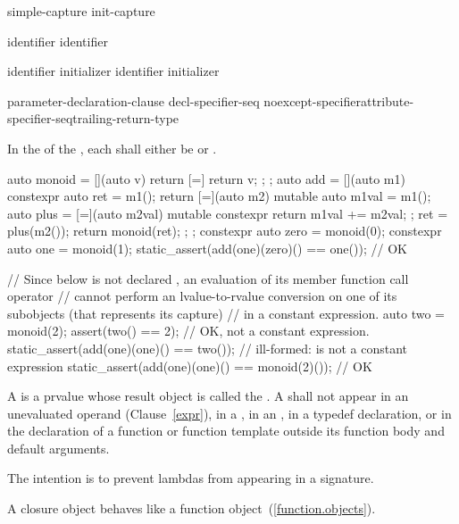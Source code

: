 \begin{bnf}
\br
    simple-capture\br
    init-capture
\end{bnf}

\begin{bnf}
\br
    identifier\br
    \terminal{\&} identifier\br
    \br
\end{bnf}

\begin{bnf}
\br
    identifier initializer\br
    \terminal{\&} identifier initializer
\end{bnf}

\begin{bnf}
\br
    \terminal{(} parameter-declaration-clause \terminal{)} decl-specifier-seq\opt\br
    \hspace*{\bnfindentinc}noexcept-specifier\opt attribute-specifier-seq\opt trailing-return-type\opt
\end{bnf}

\pnum
In the  of the ,
each 
shall either be  or .
\begin{example}
\begin{codeblock}
auto monoid = [](auto v) { return [=] { return v; }; };
auto add = [](auto m1) constexpr {
  auto ret = m1();
  return [=](auto m2) mutable {
    auto m1val = m1();
    auto plus = [=](auto m2val) mutable constexpr
                   { return m1val += m2val; };
    ret = plus(m2());
    return monoid(ret);
  };
};
constexpr auto zero = monoid(0);
constexpr auto one = monoid(1);
static_assert(add(one)(zero)() == one()); // OK

// Since  below is not declared , an evaluation of its  member function call operator
// cannot perform an lvalue-to-rvalue conversion on one of its subobjects (that represents its capture)
// in a constant expression.
auto two = monoid(2);
assert(two() == 2); // OK, not a constant expression.
static_assert(add(one)(one)() == two()); // ill-formed:  is not a constant expression
static_assert(add(one)(one)() == monoid(2)()); // OK
\end{codeblock}
\end{example}

\pnum
A  is a prvalue
whose result object is called the . A
 shall not appear in an unevaluated operand
(Clause~\ref{expr}), in a ,
in an ,
in a typedef declaration, or in the declaration of a function or function
template outside its function body and default arguments.
\begin{note}
The intention is to prevent lambdas from appearing in a signature.
\end{note}
\begin{note}
A closure object behaves like a function
object~(\ref{function.objects}).\end{note}

